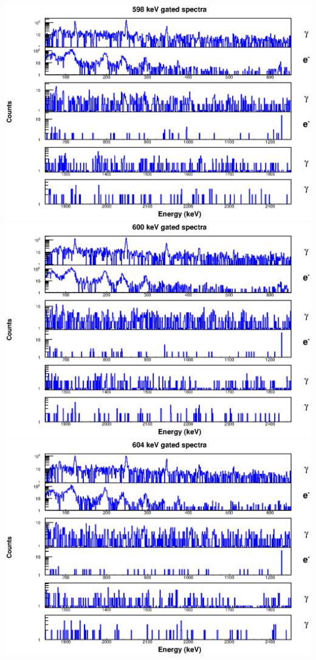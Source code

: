 \begin{landscape}
\includegraphics[scale=1.1]{154Gd_Appendix/598_combined.eps}
\includegraphics[scale=1.1]{154Gd_Appendix/600_combined.eps}
\includegraphics[scale=1.1]{154Gd_Appendix/604_combined.eps}

\end{landscape}
